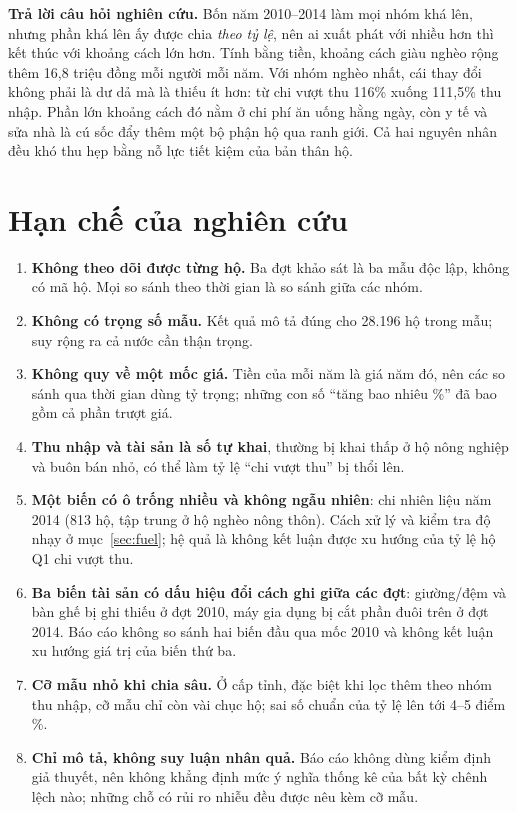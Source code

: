 \documentclass[11pt,a4paper]{article}
\newcommand{\n}[1]{\textbf{#1}}
\begin{document}
\begin{tcolorbox}[colback=tintC, colframe=tintC, boxrule=0pt, arc=5pt, left=12pt, right=12pt, top=9pt, bottom=9pt]
\textbf{Trả lời câu hỏi nghiên cứu.} Bốn năm 2010–2014 làm mọi nhóm khá lên, nhưng phần khá lên ấy được chia \emph{theo tỷ lệ}, nên ai xuất phát với nhiều hơn thì kết thúc với khoảng cách lớn hơn. Tính bằng tiền, khoảng cách giàu nghèo rộng thêm 16,8 triệu đồng mỗi người mỗi năm. Với nhóm nghèo nhất, cái thay đổi không phải là dư dả mà là thiếu ít hơn: từ chi vượt thu 116\% xuống 111,5\% thu nhập. Phần lớn khoảng cách đó nằm ở chi phí ăn uống hằng ngày, còn y tế và sửa nhà là cú sốc đẩy thêm một bộ phận hộ qua ranh giới. Cả hai nguyên nhân đều khó thu hẹp bằng nỗ lực tiết kiệm của bản thân hộ.
\end{tcolorbox}

\section{Hạn chế của nghiên cứu}

\begin{enumerate}[leftmargin=1.5em,itemsep=4pt,topsep=3pt]
\item \n{Không theo dõi được từng hộ.} Ba đợt khảo sát là ba mẫu độc lập, không có mã hộ. Mọi so sánh theo thời gian là so sánh giữa các nhóm.
\item \n{Không có trọng số mẫu.} Kết quả mô tả đúng cho 28.196 hộ trong mẫu; suy rộng ra cả nước cần thận trọng.
\item \n{Không quy về một mốc giá.} Tiền của mỗi năm là giá năm đó, nên các so sánh qua thời gian dùng tỷ trọng; những con số “tăng bao nhiêu \%” đã bao gồm cả phần trượt giá.
\item \n{Thu nhập và tài sản là số tự khai}, thường bị khai thấp ở hộ nông nghiệp và buôn bán nhỏ, có thể làm tỷ lệ “chi vượt thu” bị thổi lên.
\item \n{Một biến có ô trống nhiều và không ngẫu nhiên}: chi nhiên liệu năm 2014 (813 hộ, tập trung ở hộ nghèo nông thôn). Cách xử lý và kiểm tra độ nhạy ở mục~\ref{sec:fuel}; hệ quả là không kết luận được xu hướng của tỷ lệ hộ Q1 chi vượt thu.
\item \n{Ba biến tài sản có dấu hiệu đổi cách ghi giữa các đợt}: giường/đệm và bàn ghế bị ghi thiếu ở đợt 2010, máy gia dụng bị cắt phần đuôi trên ở đợt 2014. Báo cáo không so sánh hai biến đầu qua mốc 2010 và không kết luận xu hướng giá trị của biến thứ ba.
\item \n{Cỡ mẫu nhỏ khi chia sâu.} Ở cấp tỉnh, đặc biệt khi lọc thêm theo nhóm thu nhập, cỡ mẫu chỉ còn vài chục hộ; sai số chuẩn của tỷ lệ lên tới 4–5 điểm \%.
\item \n{Chỉ mô tả, không suy luận nhân quả.} Báo cáo không dùng kiểm định giả thuyết, nên không khẳng định mức ý nghĩa thống kê của bất kỳ chênh lệch nào; những chỗ có rủi ro nhiễu đều được nêu kèm cỡ mẫu.
\end{enumerate}
\end{document}
